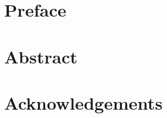 \documentclass[a4paper,twoside, 12pt]{memoir} %
\begin{document}

\chapter*{Preface}

\chapter*{Abstract}

\chapter*{Acknowledgements}
\tableofcontents*









\end{document}
